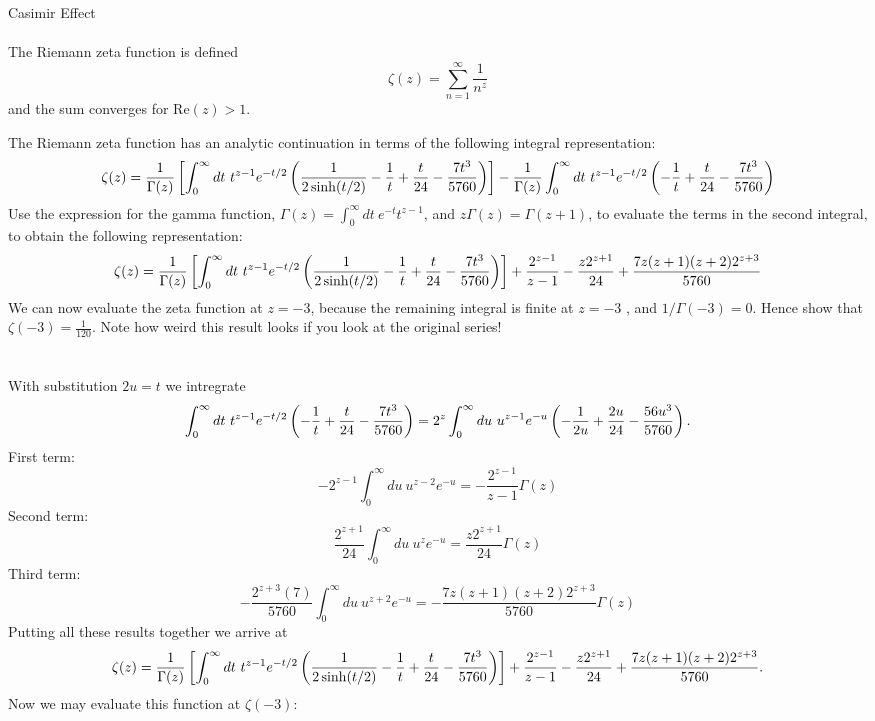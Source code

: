 \documentclass[10pt,letterpaper]{article}
\begin{document}
\item{Casimir Effect}
\\
\\
The Riemann zeta function is defined
\[
	\zeta(z) = \sum_{n=1}^\infty \frac{1}{n^z}
\]
and the sum converges for $\text{Re}(z)>1$. 
	
	\benum
	\item
	The Riemann zeta function has an analytic continuation in terms of the following integral representation:
	\[
		\zeta(z) = \frac{1}{\Gamma(z)}\left[\int_0^\infty dt\ t^{z-1}e^{-t/2}\left(\frac{1}{2\sinh(t/2)}-\frac{1}{t}
		+\frac{t}{24}-\frac{7t^3}{5760}\right)\right]-\frac{1}{\Gamma(z)}\int_0^\infty dt\ t^{z-1}e^{-t/2}\left(-\frac{1}{t}
		+\frac{t}{24}-\frac{7t^3}{5760}\right)
	\]
	Use the expression for the gamma function, $\Gamma(z) = \int_0^\infty dt\ e^{-t}t^{z-1}$, and 
	$z\Gamma(z)=\Gamma(z+1)$, to evaluate the terms in the second integral, to obtain the following
	representation:
	\[
	\zeta(z) = \frac{1}{\Gamma(z)}\blr{\int_0^\infty dt\ t^{z-1}e^{-t/2}\plr{\frac{1}{2\sinh(t/2)}-\frac{1}{t}
		+\frac{t}{24}-\frac{7t^3}{5760}}}
		+\frac{2^{z-1}}{z-1}-\frac{z2^{z+1}}{24}+\frac{7z(z+1)(z+2)2^{z+3}}{5760}
	\]
	We can now evaluate the zeta function at $z=-3$, because the remaining integral is finite at
	$z=-3$ , and $1/\Gamma(-3) = 0$. Hence show that $\zeta(-3) = \frac{1}{120}$. Note how weird this 
	result looks if you look at the original series! 
	\\
	\\
	\\
	With substitution $2u = t$ we intregrate
	\[
		\int_0^\infty dt\ t^{z-1}e^{-t/2}\plr{-\frac{1}{t} +\frac{t}{24}-\frac{7t^3}{5760}} 
		= 2^z\int_0^\infty du\ u^{z-1}e^{-u}\plr{-\frac{1}{2u}+\frac{2u}{24}-\frac{56u^3}{5760}}.
	\]
	First term:
	\[
		-2^{z-1}\int_0^\infty du\ u^{z-2}e^{-u}= -\frac{2^{z-1}}{z-1}\Gamma(z)
	\] 	
	Second term: 
	\[
		\frac{2^{z+1}}{24}\int_0^\infty du\ u^{z}e^{-u}= \frac{z2^{z+1}}{24}\Gamma(z)
	\]
	Third term:
	\[
		-\frac{2^{z+3}(7)}{5760}\int_0^\infty du\ u^{z+2}e^{-u}= -\frac{7z(z+1)(z+2)2^{z+3}}{5760}\Gamma(z)
	\]
	Putting all these results together we arrive at
	\[
	\zeta(z) = \frac{1}{\Gamma(z)}\left[\int_0^\infty dt\ t^{z-1}e^{-t/2}\left(\frac{1}{2\sinh(t/2)}-\frac{1}{t}
		+\frac{t}{24}-\frac{7t^3}{5760}\right)\right]
		+\frac{2^{z-1}}{z-1}-\frac{z2^{z+1}}{24}+\frac{7z(z+1)(z+2)2^{z+3}}{5760}.
	\]
	Now we may evaluate this function at $\zeta(-3)$:
	\ba
\end{document}
